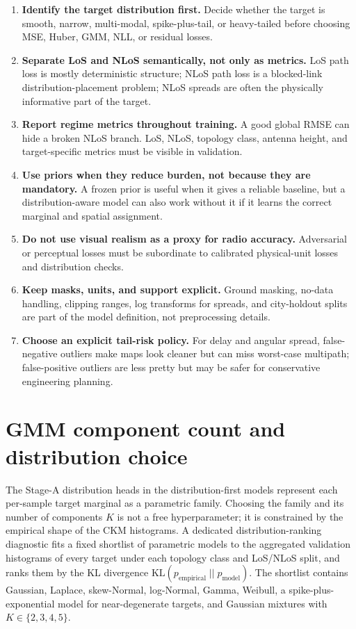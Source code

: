 \begin{enumerate}
\item \textbf{Identify the target distribution first.} Decide whether the
      target is smooth, narrow, multi-modal, spike-plus-tail, or
      heavy-tailed before choosing MSE, Huber, GMM, NLL, or residual losses.
\item \textbf{Separate LoS and NLoS semantically, not only as metrics.}
      LoS path loss is mostly deterministic structure; NLoS path loss is a
      blocked-link distribution-placement problem; NLoS spreads are often
      the physically informative part of the target.
\item \textbf{Report regime metrics throughout training.} A good global RMSE
      can hide a broken NLoS branch. LoS, NLoS, topology class, antenna
      height, and target-specific metrics must be visible in validation.
\item \textbf{Use priors when they reduce burden, not because they are
      mandatory.} A frozen prior is useful when it gives a reliable baseline,
      but a distribution-aware model can also work without it if it learns the
      correct marginal and spatial assignment.
\item \textbf{Do not use visual realism as a proxy for radio accuracy.}
      Adversarial or perceptual losses must be subordinate to calibrated
      physical-unit losses and distribution checks.
\item \textbf{Keep masks, units, and support explicit.} Ground masking,
      no-data handling, clipping ranges, log transforms for spreads, and
      city-holdout splits are part of the model definition, not preprocessing
      details.
\item \textbf{Choose an explicit tail-risk policy.} For delay and angular
      spread, false-negative outliers make maps look cleaner but can miss
      worst-case multipath; false-positive outliers are less pretty but may be
      safer for conservative engineering planning.
\end{enumerate}

\section{GMM component count and distribution choice}
\label{sec:gmm_k_choice}

The Stage-A distribution heads in the distribution-first models
represent each per-sample target marginal as a parametric family. Choosing
the family and its number of components $K$ is not a free hyperparameter; it
is constrained by the empirical shape of the CKM histograms. A dedicated
distribution-ranking diagnostic fits a fixed shortlist of parametric models
to the aggregated validation histograms of every target under each topology
class and LoS/NLoS split, and ranks them by the KL divergence
\(\mathrm{KL}(p_{\mathrm{empirical}}\;||\;p_{\mathrm{model}})\).  The shortlist
contains Gaussian, Laplace, skew-Normal, log-Normal, Gamma, Weibull, a
spike-plus-exponential model for near-degenerate targets, and Gaussian
mixtures with $K\in\{2,3,4,5\}$.

